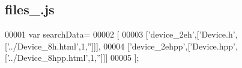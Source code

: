 \subsection{files\+\_.\+js}
\label{files__1_8js_source}

\begin{DoxyCode}
00001 var searchData=
00002 [
00003   [\textcolor{stringliteral}{'device\_2eh'},[\textcolor{stringliteral}{'Device.h'},[\textcolor{stringliteral}{'../Device\_8h.html'},1,\textcolor{stringliteral}{''}]]],
00004   [\textcolor{stringliteral}{'device\_2ehpp'},[\textcolor{stringliteral}{'Device.hpp'},[\textcolor{stringliteral}{'../Device\_8hpp.html'},1,\textcolor{stringliteral}{''}]]]
00005 ];
\end{DoxyCode}
